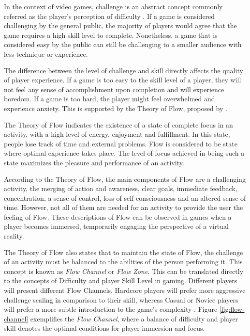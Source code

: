 In the context of video games, challenge is an abstract concept commonly referred as the player's perception of difficulty \cite{ARTICLE_RoleOfChallenge}. If a game is considered challenging by the general public, the majority of players would agree that the game requires a high skill level to complete. Nonetheless, a game that is considered easy by the public can still be challenging to a smaller audience with less technique or experience.

The difference between the level of challenge and skill directly affects the quality of player experience. If a game is too easy to the skill level of a player, they will not feel any sense of accomplishment upon completion and will experience boredom. If a game is too hard, the player might feel overwhelmed and experience anxiety. This is supported by the Theory of Flow, proposed by \citet{BOOK_Flow}.

The Theory of Flow indicates the existence of a state of complete focus in an activity, with a high level of energy, enjoyment and fulfillment. In this state, people lose track of time and external problems. Flow is considered to be state where optimal experience takes place. The level of focus achieved in being such a state maximizes the pleasure and performance of an activity.

According to the Theory of Flow, the main components of Flow are a challenging activity, the merging of action and awareness, clear goals, immediate feedback, concentration, a sense of control, loss of self-consciousness and an altered sense of time. However, not all of them are needed for an activity to provide the user the feeling of Flow. These descriptions of Flow can be observed in games when a player becomes immersed, temporarily engaging the perspective of a virtual reality.

The Theory of Flow also states that to maintain the state of Flow, the challenge of an activity must be balanced to the abilities of the person performing it. This concept is known as \emph{Flow Channel} or \emph{Flow Zone}. This can be translated directly to the concepts of Difficulty and player Skill Level in gaming. Different players will present different Flow Channels. Hardcore players will prefer more aggressive challenge scaling in comparison to their skill, whereas Casual or Novice players will prefer a more subtle introduction to the game's complexity \cite{ARTICLE_FlowInGames}. Figure \ref{fig:flow-channel} exemplifies the \emph{Flow Channel}, where a balance of difficulty and player skill denotes the optimal conditions for player immersion and focus.

